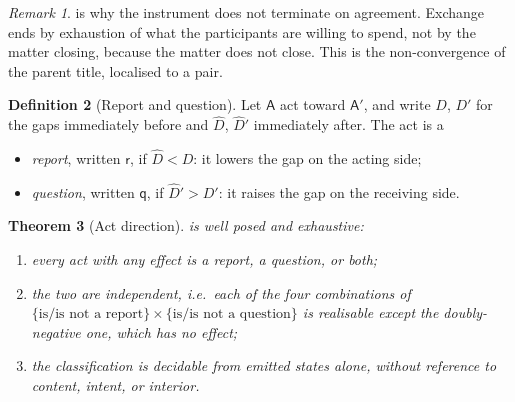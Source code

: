 \documentclass[11pt,a4paper]{article}
\theoremstyle{clstyle}
\newtheorem{theorem}{Theorem}[section]
\theoremstyle{definition}
\newtheorem{definition}[theorem]{Definition}
\theoremstyle{remark}
\newtheorem{remark}[theorem]{Remark}
\newcommand{\Ag}{\mathsf{A}}
\newcommand{\gap}{D}                     %
\newcommand{\Rep}{\mathsf{r}}            %
\newcommand{\Qst}{\mathsf{q}}            %
\begin{document}
\begin{remark}
 is why the instrument does not terminate on agreement.
Exchange ends by exhaustion of what the participants are willing to spend,
not by the matter closing, because the matter does not close. This is the
non-convergence of the parent title, localised to a pair.
\end{remark}

\begin{definition}[Report and question]
\label{def:reportquestion}
Let $\Ag$ act toward $\Ag'$, and write $\gap$, $\gap'$ for the gaps
immediately before and $\widehat{\gap}$, $\widehat{\gap}'$ immediately after.
The act is a
\begin{itemize}[leftmargin=2em]
\item \emph{report}, written $\Rep$, if $\widehat{\gap}<\gap$: it lowers the
gap on the acting side;
\item \emph{question}, written $\Qst$, if $\widehat{\gap}'>\gap'$: it raises
the gap on the receiving side.
\end{itemize}
\end{definition}

\begin{theorem}[Act direction]
\label{thm:actdirection}
 is well posed and exhaustive:
\begin{enumerate}[label=(\roman*),leftmargin=2em]
\item every act with any effect is a report, a question, or both;
\item the two are independent, i.e.\ each of the four combinations of
$\{\text{is}/\text{is not a report}\}\times\{\text{is}/\text{is not a
question}\}$ is realisable except the doubly-negative one, which has no
effect;
\item the classification is decidable from emitted states alone, without
reference to content, intent, or interior.
\end{enumerate}
\end{theorem}
\end{document}
